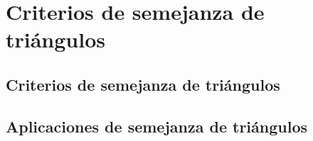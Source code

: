\thispagestyle{plain}
\section{Criterios de semejanza de triángulos}
\subsection{Criterios de semejanza de triángulos}
\subsection{Aplicaciones de semejanza de triángulos}

\newpage